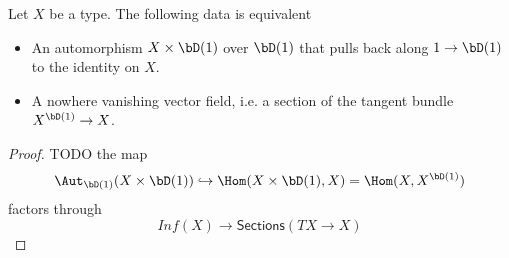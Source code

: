 


\begin{lemma}[TODO]
	Let $X$ be a type. The following data is equivalent
	\begin{itemize}
		\item An automorphism $X \times \bD(1)$ over $\bD(1)$ that pulls back along $1 \to \bD(1)$ to the identity on $X$.
		\item A nowhere vanishing vector field, i.e. a section of the tangent bundle $X^{\bD(1)} \to X$.
	\end{itemize}
\end{lemma}
\begin{proof}
	TODO
	the map
	\[
	\Aut_{\bD(1)}(X \times \bD(1)) \hookrightarrow \Hom(X \times \bD(1) , X) = \Hom(X , X^{\bD(1)})
	\]
	factors through 
	\[
	Inf(X) \to \mathsf{Sections} (T X \to X)
	\]
\end{proof}

